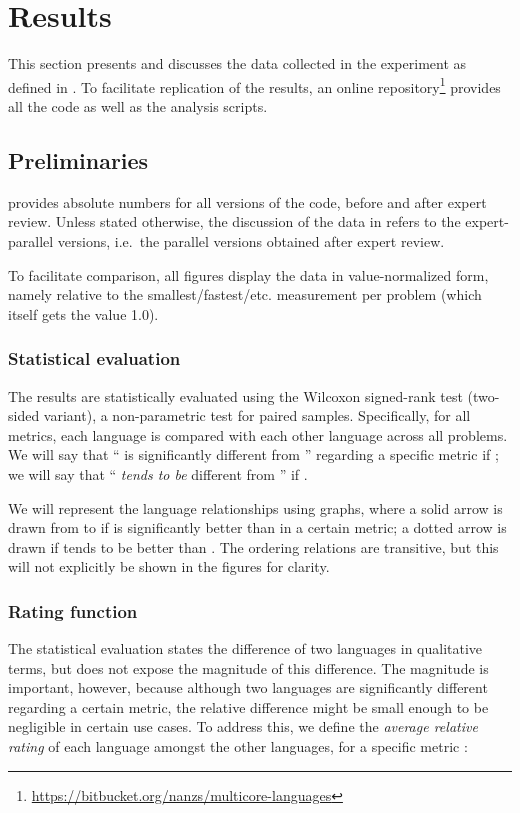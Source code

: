 \section{Results}
\label{sec:results}

This section presents and discusses the data collected in the experiment as defined in . To facilitate replication of the results, an online repository\footnote{\url{https://bitbucket.org/nanzs/multicore-languages}} provides all the code as well as the analysis scripts. 

\subsection{Preliminaries}
\label{sec:preliminaries}

 provides absolute numbers for all versions of the code, before and after expert review. 
Unless stated otherwise, the discussion of the data in  refers to the expert-parallel versions, i.e.\ the parallel versions obtained after expert review.

To facilitate comparison, all figures display the data in value-normalized form, namely relative to the smallest/fastest/etc. measurement per problem (which itself gets the value 1.0).

\subsubsection{Statistical evaluation} The results are statistically evaluated using the Wilcoxon signed-rank test (two-sided variant), a non-parametric test for paired samples. Specifically, for all metrics, each language is compared with each other language across all problems. We will say that `` is significantly different from '' regarding a specific metric if ; we will say that `` \emph{tends to be} different from '' if . 

We will represent the language relationships using graphs, where a solid arrow is drawn from  to  if  is significantly better than  in a certain metric; a dotted arrow is drawn if  tends to be better than . The ordering relations are transitive, but this will not explicitly be shown in the figures for clarity.

\subsubsection{Rating function} The statistical evaluation states the difference of two languages in qualitative terms, but does not expose the magnitude of this difference. The magnitude is important, however, because although two languages are significantly different regarding a certain metric, the relative difference might be small enough to be negligible in certain use cases. To address this, we define the \emph{average relative rating} of each language amongst the other languages, for a specific metric :

